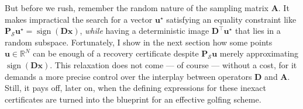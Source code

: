 But before we rush, remember the random nature of the sampling matrix $\mathbf{A}$. It makes impractical the search for a vector $\mathbf{u}^\star$ satisfying an equality constraint like $\mathbf{P}_{\mathcal{S}} \mathbf{u}^\star =  \operatorname{sign} \left ( \mathbf{Dx} \right )$, \emph{while} having a deterministic image $\mathbf{D}^\top \mathbf{u}^\star$ that lies in a random subspace. Fortunately, I show in the next section how some points $\mathbf{u} \in \mathbb{R}^{N}$ can be enough of a recovery certificate despite $\mathbf{P}_{\mathcal{S}} \mathbf{u}$ merely approximating $\operatorname{sign} \left ( \mathbf{Dx} \right )$. This relaxation does not come --- of course --- without a cost, for it demands a more precise control over the interplay between operators $\mathbf{D}$ and $\mathbf{A}$. Still, it pays off, later on, when the defining expressions for these inexact certificates are turned into the blueprint for an effective golfing scheme.